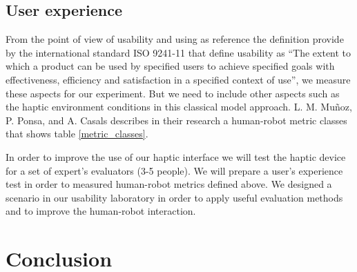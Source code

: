 \documentclass[journal,twoside]{JoPhA}
\begin{document}
\subsection{User experience}

From the point of view of usability and using as reference the definition provide by the international standard ISO 9241-11 \cite{ISO98} that define usability as “The extent to which a product can be used by specified users to achieve specified goals with effectiveness, efficiency and satisfaction in a specified context of use”, we measure these aspects for our experiment. But we need to include other aspects such as the haptic environment conditions in this classical model approach. L. M. Muñoz, P. Ponsa, and A. Casals \cite{Munoz12} describes in their research a human-robot metric classes that shows table \ref{metric_classes}.

\begin{table}[h]
\centering
\caption{\label{metric_classes}Human-Robot metric classes}
\end{table}

In order to improve the use of our haptic interface we will test the haptic device for a set of expert's evaluators (3-5 people). We will prepare a user's experience test in order to measured human-robot metrics defined above. We designed a scenario in our usability laboratory in order to apply useful evaluation methods and to improve the human-robot interaction.


\section{Conclusion}
\end{document}

